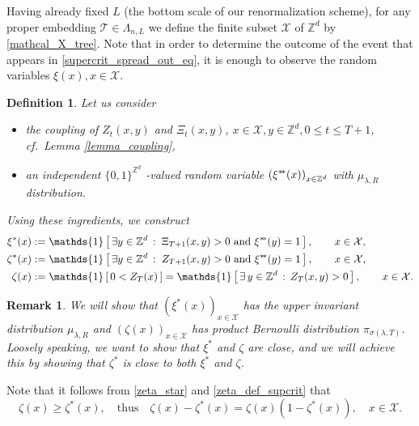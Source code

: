 \documentclass[a4paper,12pt]{article}
\newtheorem  {definition}    [theorem]{Definition}
\newtheorem  {remark}        [theorem]{Remark}
\newcommand{\sstar}{* \hspace{-.05cm} *}
\begin{document}
Having already fixed $L$ (the bottom scale of our renormalization scheme), for any proper embedding $\mathcal{T} \in \Lambda_{n,L}$
we define the finite subset $\mathcal{X}$ of $\mathbb{Z}^d$ by \eqref{mathcal_X_tree}.
Note that in order to determine the outcome of the event that appears in \eqref{supercrit_spread_out_eq}, it is enough to observe the random variables $\xi(x), x \in \mathcal{X}$.



\begin{definition}\label{def_ingredients_supercrit} Let us consider
\begin{itemize}
\item the coupling of  $Z_t(x,y)$ and $\Xi_t(x,y)$, $x \in \mathcal{X}, y \in \mathbb{Z}^d, 0 \leq t \leq T+1$, cf.\ Lemma  \ref{lemma_coupling},
\item an independent  $\{0,1\}^{\mathbb{Z}^d}$ -valued
 random variable $\left(\xi^{\sstar}(x)\right)_{x \in \mathbb{Z}^d}$ with    $\mu_{\lambda,R}$  distribution.
\end{itemize}
Using these ingredients, we  construct
\begin{align}
\label{xi_star}
\xi^{*}(x) & := \mathds{1}\left[  \, \exists y \in \mathbb{Z}^d \, : \;  \Xi_{T+1}(x,y)>0 \text{ and }  \xi^{\sstar}(y)=1 \,  \right], \qquad x \in \mathcal{X}, \\
\label{zeta_star}
  \zeta^*(x) & := \mathds{1}\left[ \, \exists y \in \mathbb{Z}^d \, : \;  Z_{T+1}(x,y)>0 \text{ and }  \xi^{\sstar}(y)=1 \, \right],  \qquad x \in \mathcal{X}, \\
\label{zeta_def_supcrit}
  \zeta(x) & := \mathds{1}\left[ \, 0<  Z_T(x)  \, \right]= \mathds{1}\left[ \, \exists \, y \in \mathbb{Z}^d \, : \, Z_T(x,y) >0    \, \right], \qquad x \in \mathcal{X}.
\end{align}
\end{definition}

\begin{remark}  We will show that $(\xi^*(x))_{x \in \mathcal{X}}$ has the upper invariant distribution $\mu_{\lambda,R}$ and  $(\zeta(x))_{x \in \mathcal{X}}$ has product Bernoulli distribution $\pi_{\sigma(\lambda,T)}$. Loosely speaking, we want to show that $\xi^*$ and $\zeta$ are close, and we will achieve
this by showing that $\zeta^*$ is  close to both $\xi^*$ and $\zeta$.
\end{remark}

Note that it follows from \eqref{zeta_star} and \eqref{zeta_def_supcrit} that
\begin{equation}\label{zeta_geq_zeta_star}
  \zeta(x) \geq \zeta^*(x), \quad \text{thus} \quad \zeta(x)-\zeta^*(x)=\zeta(x)(1-\zeta^*(x)), \quad   x \in \mathcal{X}.
\end{equation}
\end{document}
